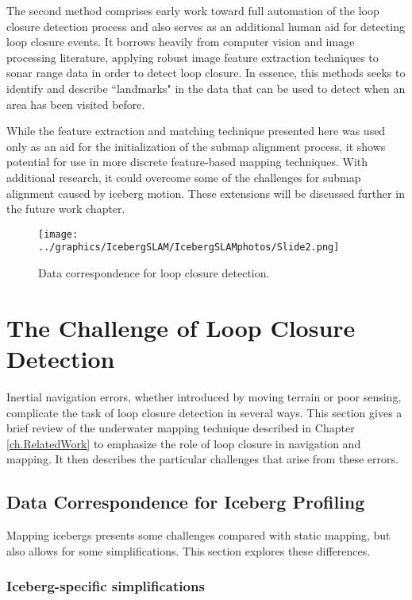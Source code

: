 The second method comprises early work toward full automation of the loop closure detection process and also serves as an additional human aid for detecting loop closure events. It borrows heavily from computer vision and image processing literature, applying robust image feature extraction techniques to sonar range data in order to detect loop closure. In essence, this methods seeks to identify and describe ``landmarks" in the data that can be used to detect when an area has been visited before. 

 While the feature extraction and matching technique presented here was used only as an aid for the initialization of the submap alignment process, it shows potential for use in more discrete feature-based mapping techniques. With additional research, it could overcome some of the challenges for submap alignment caused by iceberg motion. These extensions will be discussed further in the future work chapter.

\begin{figure}[htb]
   \centering
   \texttt{[image: ../graphics/IcebergSLAM/IcebergSLAMphotos/Slide2.png]} %
   \caption{Data correspondence for loop closure detection. }
   \label{fig:icebergSLAMLC}
\end{figure}

\section{The Challenge of Loop Closure Detection}

Inertial navigation errors, whether introduced by moving terrain or poor sensing, complicate the task of loop closure detection in several ways. This section gives a brief review of the underwater mapping technique described in Chapter \ref{ch.RelatedWork} to emphasize the role of loop closure in navigation and mapping. It then describes the particular challenges that arise from these errors.

\subsection{Data Correspondence for Iceberg Profiling}

Mapping icebergs presents some challenges compared with static mapping, but also allows for some simplifications. This section explores these differences.

\subsubsection{Iceberg-specific simplifications}

